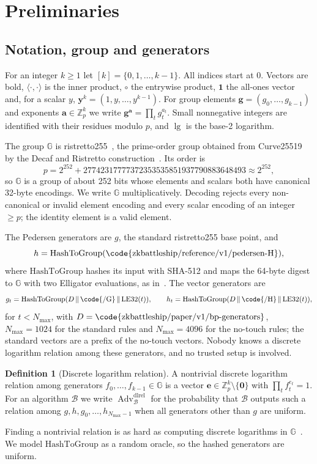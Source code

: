 \documentclass[11pt]{article}
\theoremstyle{definition}
\newtheorem{definition}[lemma]{Definition}
\theoremstyle{remark}
\newcommand{\Z}{\mathbb{Z}}
\newcommand{\G}{\mathbb{G}}
\newcommand{\Adv}{\operatorname{Adv}}
\newcommand{\bv}{\mathbf}
\newcommand{\one}{\mathbf 1}
\begin{document}
\section{Preliminaries}\label{sec:prelim}
\subsection{Notation, group and generators}\label{sec:group}
For an integer $k\ge1$ let $[k]=\{0,1,\ldots,k-1\}$. All indices start at $0$. Vectors are bold, $\langle\cdot,\cdot\rangle$ is the inner product, $\circ$ the entrywise product, $\one$ the all-ones vector and, for a scalar $y$, $\bv y^{k}=(1,y,\ldots,y^{k-1})$. For group elements $\bv g=(g_0,\ldots,g_{k-1})$ and exponents $\bv a\in\Z_p^k$ we write $\bv g^{\bv a}=\prod_t g_t^{a_t}$. Small nonnegative integers are identified with their residues modulo $p$, and $\lg$ is the base-2 logarithm.

The group $\G$ is ristretto255~\cite{rfc9496}, the prime-order group obtained from Curve25519 by the Decaf and Ristretto construction~\cite{decaf}. Its order is
\[
  p=2^{252}+27742317777372353535851937790883648493\approx 2^{252},
\]
so $\G$ is a group of about 252 bits whose elements and scalars both have canonical 32-byte encodings. We write $\G$ multiplicatively. Decoding rejects every non-canonical or invalid element encoding and every scalar encoding of an integer $\ge p$; the identity element is a valid element.

The Pedersen generators are $g$, the standard ristretto255 base point, and
\[
  h=\mathrm{HashToGroup}(\text{\code{zkbattleship/reference/v1/pedersen-H}}),
\]
where $\mathrm{HashToGroup}$ hashes its input with SHA-512 and maps the 64-byte digest to $\G$ with two Elligator evaluations, as in~\cite{rfc9496}. The vector generators are
\[
  g_t=\mathrm{HashToGroup}(D\,\|\,\text{\code{/G}}\,\|\,\mathrm{LE32}(t)),\qquad
  h_t=\mathrm{HashToGroup}(D\,\|\,\text{\code{/H}}\,\|\,\mathrm{LE32}(t)),
\]
for $t<N_{\max}$, with $D=\text{\code{zkbattleship/paper/v1/bp-generators}}$, $N_{\max}=1024$ for the standard rules and $N_{\max}=4096$ for the no-touch rules; the standard vectors are a prefix of the no-touch vectors. Nobody knows a discrete logarithm relation among these generators, and no trusted setup is involved.

\begin{definition}[Discrete logarithm relation]\label{def:dlrel}
A nontrivial discrete logarithm relation among generators $f_0,\ldots,f_{k-1}\in\G$ is a vector $\bv e\in\Z_p^k\setminus\{\bv0\}$ with $\prod_t f_t^{e_t}=1$. For an algorithm $\mathcal B$ we write $\Adv^{\mathrm{dlrel}}_{\mathcal B}$ for the probability that $\mathcal B$ outputs such a relation among $g,h,g_0,\ldots,h_{N_{\max}-1}$ when all generators other than $g$ are uniform.
\end{definition}
Finding a nontrivial relation is as hard as computing discrete logarithms in $\G$~\cite{bulletproofs}. We model $\mathrm{HashToGroup}$ as a random oracle, so the hashed generators are uniform.
\end{document}
